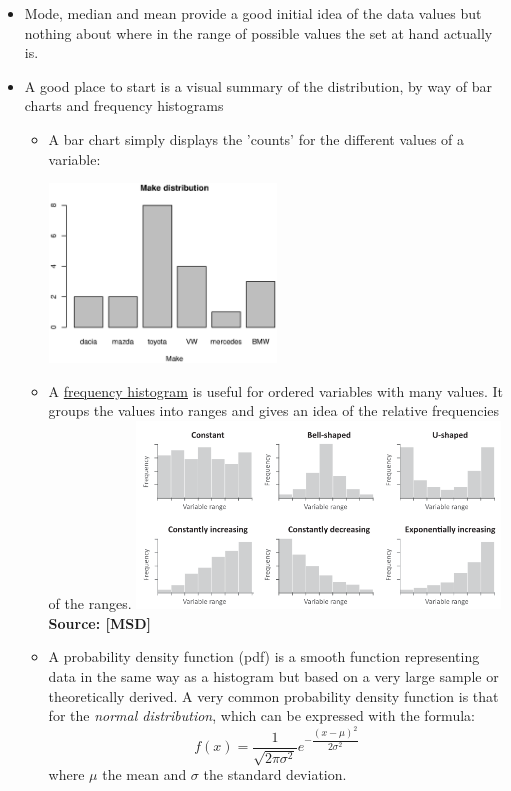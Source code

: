 \begin{itemize}
\item Mode, median and mean provide a good initial idea of the data values but nothing about where in the range of possible values the set at hand actually is. 
\item A good place to start is a visual summary of the distribution, by way of bar charts and frequency histograms
\begin{itemize}
\item A bar chart simply displays the 'counts' for the different values of a variable: \par
  \includegraphics[width=0.5\textwidth]{barchart.eps} 
\item A \href{https://www.datacamp.com/community/tutorials/make-histogram-basic-r#gs.o8GxTqU}{frequency histogram} is useful for ordered variables with many values. It groups the values into ranges and gives an idea of the relative frequencies of the ranges.
\includegraphics[width=0.8\textwidth]{histograms.png}\\ [-1.5ex]
{\fontsize{10}{0}\selectfont \textbf{Source: [MSD]}}
\newpage
\item A probability density function (pdf) is a smooth function representing data in the same way as a histogram but based on a very large sample or theoretically derived. A very common probability density function is that for the \emph{normal distribution}, which can be expressed with the formula:
  $$f(x) = \dfrac{1}{\sqrt{2\pi\sigma^2}}e^{-\dfrac{(x-\mu)^2}{2\sigma^2}}$$
  where $\mu$ the mean and $\sigma$ the standard deviation.


\end{itemize}
\end{itemize}
